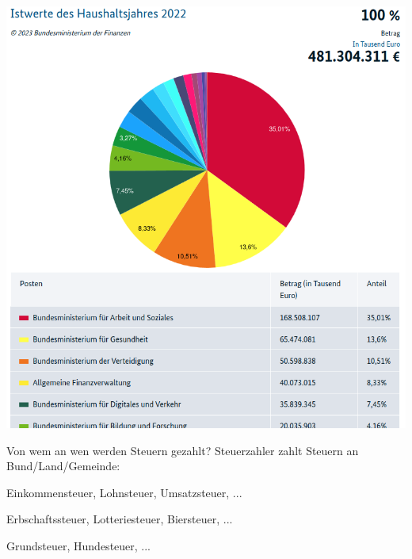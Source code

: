 \documentclass{beamer}
\begin{document}
			\begin{frame}
				\begin{center}
					\includegraphics[height=\textheight]{images/bundeshaushalt.png}
				\end{center}
			\end{frame}
		
			\begin{frame}{Von wem an wen werden Steuern gezahlt?}
				Steuerzahler zahlt Steuern an Bund/Land/Gemeinde:\n
				
				\begin{description}[An Gemeinde]
					\item[An Bund] Einkommensteuer, Lohnsteuer, Umsatzsteuer, ...
					\item[An Land] Erbschaftssteuer, Lotteriesteuer, Biersteuer, ...
					\item[An Gemeinde] Grundsteuer, Hundesteuer, ...
				\end{description}
			\end{frame}
		
\end{document}
